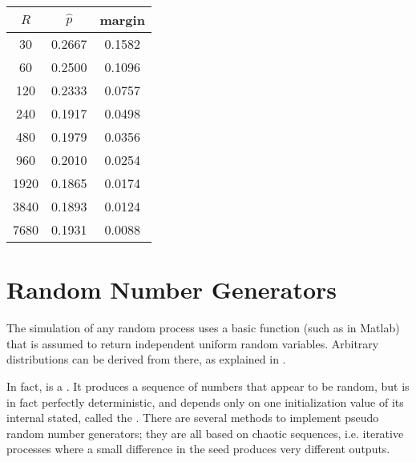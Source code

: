 \begin{table}
\center\begin{tabular}{|c|c|c|}
  \hline
  $R$ & $\hat{p}$ & margin \\ \hline \hline
  30 & 0.2667 & 0.1582 \\
  60 & 0.2500 & 0.1096 \\
  120 & 0.2333 & 0.0757 \\
  240 & 0.1917 & 0.0498 \\
  480 & 0.1979 & 0.0356 \\
  960 & 0.2010 & 0.0254 \\
  1920 & 0.1865 & 0.0174 \\
  3840 & 0.1893 & 0.0124 \\
  7680 & 0.1931 & 0.0088 \\ \hline
\end{tabular}
\end{table}


\section{Random Number Generators} 

The simulation of any random process uses a basic function (such
as  in Matlab) that is assumed to return independent
uniform random variables. Arbitrary distributions can be derived
from there, as explained in .

In fact,  is a . It
produces a sequence of numbers that appear to be random, but is in
fact perfectly deterministic, and depends only on one
initialization value of its internal stated, called the .
There are several methods to implement pseudo random number
generators; they are all based on chaotic sequences, i.e.
iterative processes where a small difference in the seed produces
very different outputs.

